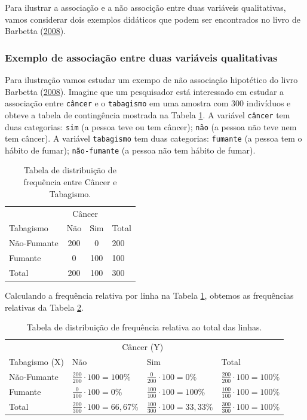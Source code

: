 \documentclass[]{article}
\begin{document}
Para ilustrar a associação e a não associção entre duas variáveis qualitativas,
vamos considerar dois exemplos didáticos que podem ser encontrados no livro de
Barbetta (\protect\hyperlink{ref-barbetta2008estatistica}{2008}).

\hypertarget{exemplo-de-associauxe7uxe3o-entre-duas-variuxe1veis-qualitativas}{%
\subsubsection{Exemplo de associação entre duas variáveis qualitativas}\label{exemplo-de-associauxe7uxe3o-entre-duas-variuxe1veis-qualitativas}}

Para ilustração vamos estudar um exempo de não associação hipotético do livro Barbetta (\protect\hyperlink{ref-barbetta2008estatistica}{2008}). Imagine que um pesquisador está interessado em estudar a associação entre \texttt{câncer} e o \texttt{tabagismo} em uma amostra com 300 indivíduos e obteve a tabela de contingência mostrada na Tabela \ref{tab:associacao}. A variável \texttt{câncer} tem duas categorias: \texttt{sim} (a pessoa teve ou tem câncer); \texttt{não} (a pessoa não teve nem tem câncer). A variável \texttt{tabagismo} tem duas categorias: \texttt{fumante} (a pessoa tem o hábito de fumar); \texttt{não-fumante} (a pessoa não tem hábito de fumar).

\begin{table}[htbp]
\centering
\caption{Tabela de distribuição de frequência entre Câncer e Tabagismo.}
\label{tab:associacao}
\begin{tabular}{l|cc|l}
    & \multicolumn{2}{|c|}{Câncer} & \\ \cline{2-3}
    Tabagismo & Não & Sim & Total\\ \hline
    Não-Fumante & 200 & 0 & 200 \\
    Fumante & 0 & 100 & 100\\ \hline
    Total & 200 & 100 & 300
\end{tabular}
\end{table}

Calculando a frequência relativa por linha na Tabela \ref{tab:associacao}, obtemos as frequências relativas da Tabela \ref{tab:associacaoRel}.

\begin{table}[htbp]
\centering
\caption{Tabela de distribuição de frequência relativa ao total das linhas.}
\label{tab:associacaoRel}
\begin{tabular}{l|ll|l}
& \multicolumn{2}{|c|}{Câncer (Y)} & \\ \cline{2-3}
Tabagismo (X) & Não & Sim & Total\\ \hline
Não-Fumante & $\frac{200}{200}\cdot 100 = 100\%$ & {\color{brown} $\frac{0}{200}\cdot 100 = 0\%$} & $\frac{200}{200}\cdot 100= 100\%$ \\
Fumante & $\frac{0}{100}\cdot 100 = 0\%$  & {\color{blue} $\frac{100}{100}\cdot 100= 100\%$} &  $\frac{100}{100}\cdot 100=100\%$ \\ \hline
Total & $\frac{200}{300}\cdot 100= 66,67\%$ & {\color{red} $\frac{100}{300}\cdot 100 = 33,33\%$}  & $\frac{300}{300}\cdot 100= 100\%$ 
\end{tabular}
\end{table}
\end{document}
